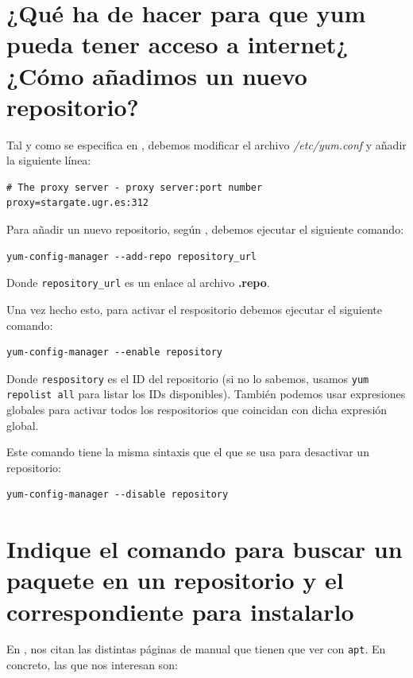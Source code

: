 \documentclass[10pt,a4paper,spanish]{article}
\numberwithin{equation}{section} %
\numberwithin{figure}{section} %
\numberwithin{table}{section} %
\begin{document}
\section{¿Qué ha de hacer para que yum pueda tener acceso a internet¿ ¿Cómo añadimos un nuevo repositorio?}
Tal y como se especifica en \cite{proxycentos}, debemos modificar el archivo \textit{/etc/yum.conf} y añadir la siguiente línea:

\begin{verbatim}
# The proxy server - proxy server:port number
proxy=stargate.ugr.es:312
\end{verbatim}

Para añadir un nuevo repositorio, según \cite{addrepo}, debemos ejecutar el siguiente comando:

\begin{verbatim}
yum-config-manager --add-repo repository_url
\end{verbatim}

Donde \texttt{repository\_url} es un enlace al archivo \textbf{.repo}. 

Una vez hecho esto, para activar el respositorio debemos ejecutar el siguiente comando:
\begin{verbatim}
yum-config-manager --enable repository
\end{verbatim}

Donde \texttt{respository} es el ID del repositorio (si no lo sabemos, usamos \texttt{yum repolist all} para listar los IDs disponibles). También podemos usar expresiones globales para activar todos los respositorios que coincidan con dicha expresión global.

Este comando tiene la misma sintaxis que el que se usa para desactivar un repositorio:
\begin{verbatim}
yum-config-manager --disable repository
\end{verbatim}

\section{Indique el comando para buscar un paquete en un repositorio y el correspondiente para instalarlo}
En \cite{manapt}, nos citan las distintas páginas de manual que tienen que ver con \texttt{apt}. En concreto, las que nos interesan son:
\end{document}

